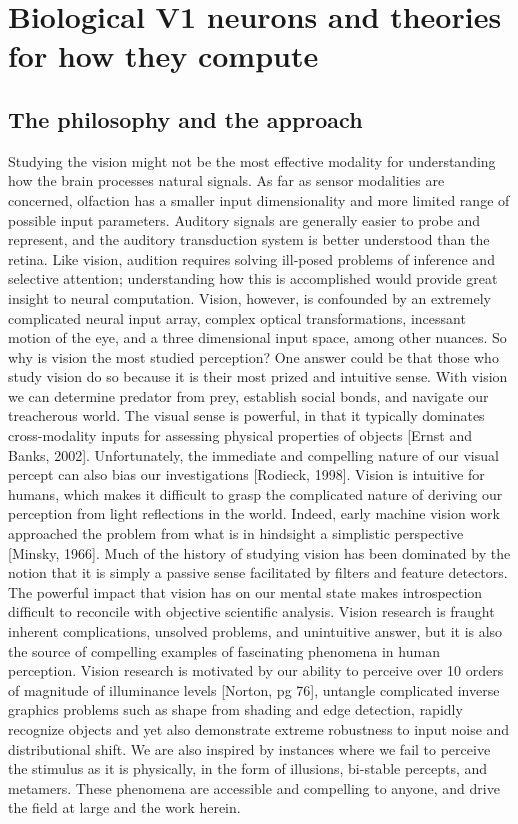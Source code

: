 \chapter{Biological V1 neurons and theories for how they compute}

\section{The philosophy and the approach}
Studying the vision might not be the most effective modality for understanding how the brain processes natural signals. As far as sensor modalities are concerned, olfaction has a smaller input dimensionality and more limited range of possible input parameters. Auditory signals are generally easier to probe and represent, and the auditory transduction system is better understood than the retina. Like vision, audition requires solving ill-posed problems of inference and selective attention; understanding how this is accomplished would provide great insight to neural computation. Vision, however, is confounded by an extremely complicated neural input array, complex optical transformations, incessant motion of the eye, and a three dimensional input space, among other nuances. So why is vision the most studied perception? One answer could be that those who study vision do so because it is their most prized and intuitive sense. With vision we can determine predator from prey, establish social bonds, and navigate our treacherous world. The visual sense is powerful, in that it typically dominates cross-modality inputs for assessing physical properties of objects [Ernst and Banks, 2002]. Unfortunately, the immediate and compelling nature of our visual percept can also bias our investigations [Rodieck, 1998]. Vision is intuitive for humans, which makes it difficult to grasp the complicated nature of deriving our perception from light reflections in the world. Indeed, early machine vision work approached the problem from what is in hindsight a simplistic perspective [Minsky, 1966]. Much of the history of studying vision has been dominated by the notion that it is simply a passive sense facilitated by filters and feature detectors. The powerful impact that vision has on our mental state makes introspection difficult to reconcile with objective scientific analysis. Vision research is fraught inherent complications, unsolved problems, and unintuitive answer, but it is also the source of compelling examples of fascinating phenomena in human perception. Vision research is motivated by our ability to perceive over 10 orders of magnitude of illuminance levels [Norton, pg 76], untangle complicated inverse graphics problems such as shape from shading and edge detection, rapidly recognize objects and yet also demonstrate extreme robustness to input noise and distributional shift. We are also inspired by instances where we fail to perceive the stimulus as it is physically, in the form of illusions, bi-stable percepts, and metamers. These phenomena are accessible and compelling to anyone, and drive the field at large and the work herein.

